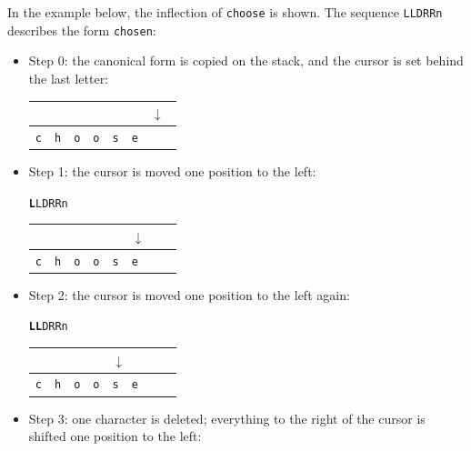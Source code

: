 \bigskip \noindent In the example below, the inflection of \verb+choose+ is
shown. The sequence \verb+LLDRRn+ describes the form \verb+chosen+:

\begin{itemize}
  \item Step 0: the canonical form is copied on the stack, and the cursor is set behind the last letter:
  
  \begin{center}
\begin{tabular}{|l|l|l|l|l|l|l|l}
\multicolumn{6}{l}{} & \multicolumn{2}{l}{$\downarrow$} \\
\hline
\verb+c+ & \verb+h+ & \verb+o+ & \verb+o+ & \verb+s+ & \verb+e+ & \verb+ + & \\
\hline
\end{tabular}
\end{center}

\bigskip
\item Step 1: the cursor is moved one position to the left:

\begin{center}
\texttt{\textbf{L}LDRRn}

\begin{tabular}{|l|l|l|l|l|l|l|l}
\multicolumn{5}{l}{} & \multicolumn{3}{l}{$\downarrow$} \\
\hline
\verb+c+ & \verb+h+ & \verb+o+ & \verb+o+ & \verb+s+ & \verb+e+ & \verb+ + & \\
\hline
\end{tabular}
\end{center}

\bigskip
\item Step 2: the cursor is moved one position to the left again:

\begin{center}
\texttt{\textbf{LL}DRRn}

\begin{tabular}{|l|l|l|l|l|l|l|l}
\multicolumn{4}{l}{} & \multicolumn{4}{l}{$\downarrow$} \\
\hline
\verb+c+ & \verb+h+ & \verb+o+ & \verb+o+ & \verb+s+ & \verb+e+ & \verb+ + & \\
\hline
\end{tabular}
\end{center}

\bigskip \item Step 3: one character is deleted; everything to the right of the
cursor is shifted one position to the left:


\end{itemize}
